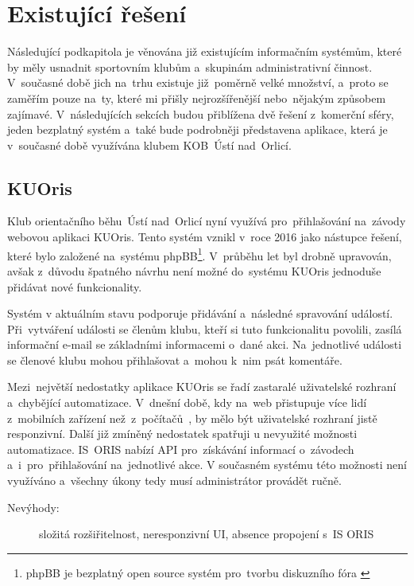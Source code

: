 \section{Existující řešení}
Následující podkapitola je věnována již existujícím informačním systémům, které by měly usnadnit sportovním klubům a~skupinám administrativní činnost. V~současné době jich na~trhu existuje již~poměrně velké množství, a~proto se zaměřím pouze na~ty, které mi přišly nejrozšířenější nebo~nějakým způsobem zajímavé. V~následujících sekcích budou přiblížena dvě řešení z~komerční sféry, jeden bezplatný systém a~také bude podrobněji představena aplikace, která je v~současné době využívána klubem KOB~Ústí nad~Orlicí.

\subsection{KUOris}
\label{section:kuoris}
Klub orientačního běhu~Ústí nad~Orlicí nyní využívá pro~přihlašování na~závody webovou aplikaci KUOris. Tento systém vznikl v~roce 2016 jako nástupce řešení, které bylo založené na~systému phpBB\footnote{phpBB je bezplatný open source systém pro~tvorbu diskuzního fóra \cite{phpbb}}. V~průběhu let byl drobně upravován, avšak z~důvodu špatného návrhu není možné do~systému KUOris jednoduše přidávat nové funkcionality.

Systém v aktuálním stavu podporuje přidávání a~následné spravování událostí. Při~vytváření události se členům klubu, kteří si tuto funkcionalitu povolili, zasílá informační e-mail se základními informacemi o~dané akci. Na~jednotlivé události se členové klubu mohou přihlašovat a~mohou k~nim psát komentáře.

Mezi~největší nedostatky aplikace KUOris se řadí zastaralé uživatelské rozhraní a~chybějící automatizace. V~dnešní době, kdy na~web přistupuje více lidí z~mobilních zařízení než~z~počítačů~\cite{deviceusage}, by mělo být uživatelské rozhraní jistě responzivní. Další již zmíněný nedostatek spatřuji u nevyužité možnosti automatizace. IS~ORIS nabízí API pro~získávání informací o~závodech a~i~pro~přihlašování na~jednotlivé akce. V současném systému této možnosti není využíváno a~všechny úkony tedy musí administrátor provádět ručně.

\begin{description}
	\item[Nevýhody:] složitá rozšiřitelnost, neresponzivní UI, absence propojení s~IS ORIS
\end{description}

